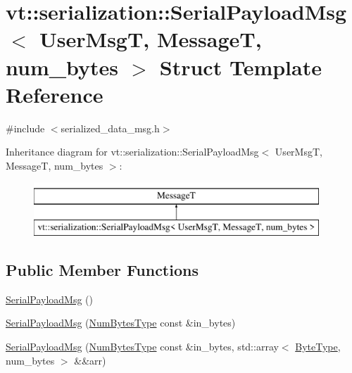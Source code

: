 \hypertarget{structvt_1_1serialization_1_1_serial_payload_msg}{}\section{vt\+:\+:serialization\+:\+:Serial\+Payload\+Msg$<$ User\+MsgT, MessageT, num\+\_\+bytes $>$ Struct Template Reference}
\label{structvt_1_1serialization_1_1_serial_payload_msg}


{\ttfamily \#include $<$serialized\+\_\+data\+\_\+msg.\+h$>$}

Inheritance diagram for vt\+:\+:serialization\+:\+:Serial\+Payload\+Msg$<$ User\+MsgT, MessageT, num\+\_\+bytes $>$\+:\begin{figure}[H]
\begin{center}
\leavevmode
\includegraphics[height=2.000000cm]{structvt_1_1serialization_1_1_serial_payload_msg}
\end{center}
\end{figure}
\subsection*{Public Member Functions}
\begin{DoxyCompactItemize}
\item 
\hyperlink{structvt_1_1serialization_1_1_serial_payload_msg_ace671323292af96db63162020c968bc8}{Serial\+Payload\+Msg} ()
\item 
\hyperlink{structvt_1_1serialization_1_1_serial_payload_msg_a8e63da32454ab38b811cbeff74bb900d}{Serial\+Payload\+Msg} (\hyperlink{namespacevt_1_1serialization_aaa03b9b407ed5776043c163629312e40}{Num\+Bytes\+Type} const \&in\+\_\+bytes)
\item 
\hyperlink{structvt_1_1serialization_1_1_serial_payload_msg_a7d764a97a65d9a801f72f83ebe025f80}{Serial\+Payload\+Msg} (\hyperlink{namespacevt_1_1serialization_aaa03b9b407ed5776043c163629312e40}{Num\+Bytes\+Type} const \&in\+\_\+bytes, std\+::array$<$ \hyperlink{namespacevt_aab8d55968084610ce3b17057981e9300}{Byte\+Type}, num\+\_\+bytes $>$ \&\&arr)
\end{DoxyCompactItemize}
